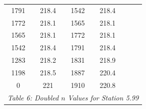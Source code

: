 \begin{center}
\begin{tabular}{|cc||cc||cc|}
    1791     & 218.4                    & 1542 & 218.4                         &          &                                     \\
    1772     & 218.1                    & 1565 & 218.1                         &          &                                     \\
    1565     & 218.1                    & 1772 & 218.1                         &          &                                     \\
    1542     & 218.4                    & 1791 & 218.4                         &          &                                     \\
    1283     & 218.2                    & 1831 & 218.9                         &          &                                     \\
    1198     & 218.5                    & 1887 & 220.4                         &          &                                     \\
    0        & 221                      & 1910 & 220.8                         &          &                                     \\
    \hline\multicolumn{6}{c}{\emph{Table 6: Doubled $n$ Values for Station 5.99}}
\end{tabular}


\end{center}

